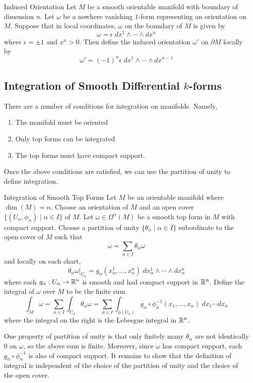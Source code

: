 \documentclass[a4paper]{article}
\begin{document}
\begin{defn}{Induced Orientation}{} Let $M$ be a smooth orientable manifold with boundary of dimension $n$. Let $\omega$ be a nowhere vanishing $1$-form representing an orientation on $M$. Suppose that in local coordinates, $\omega$ on the boundary of $M$ is given by $$\omega=\epsilon\;dx^1\wedge\cdots\wedge dx^n$$ where $\epsilon=\pm1$ and $x^n>0$. Then define the induced orientation $\omega'$ on $\partial M$ locally by $$\omega'=(-1)^n\epsilon\;dx^1\wedge\cdots\wedge dx^{n-1}$$
\end{defn}

\subsection{Integration of Smooth Differential $k$-forms}
There are a number of conditions for integration on manifolds. Namely, 
\begin{enumerate}
\item The manifold must be oriented
\item Only top forms can be integrated
\item The top forms must have compact support. 
\end{enumerate}

Once the above conditions are satisfied, we can use the partition of unity to define integration.  

\begin{defn}{Integration of Smooth Top Forms}{} Let $M$ be an orientable manifold where $\dim(M)=n$. Choose an orientation of $M$ and an open cover $\{(U_\alpha,\phi_\alpha)\;|\;\alpha\in I\}$ of $M$. Let $\omega\in\Omega^n(M)$ be a smooth top form in $M$ with compact support. Choose a partition of unity $\{\theta_\alpha\;|\;\alpha\in I\}$ subordinate to the open cover of $M$ such that $$\omega=\sum_{\alpha\in I}\theta_\alpha\omega$$ and locally on each chart, $$\theta_\alpha\omega|_{U_\alpha}=g_\alpha(x_\alpha^1,\dots,x_\alpha^n)\;dx_\alpha^1\wedge\cdots\wedge dx_\alpha^n$$ where each $g_\alpha:U_\alpha\to\mathbb{R}^n$ is smooth and had compact support in $\mathbb{R}^n$. Define the integral of $\omega$ over $M$ to be the finite sum $$\int_M\omega=\sum_{\alpha\in I}\int_{U_\alpha}\theta_\alpha\omega=\sum_{\alpha\in I}\int_{\phi(U_\alpha)}g_\alpha\circ\phi_\alpha^{-1}(x_1,\dots,x_n)\;dx_1\cdots dx_n$$ where the integral on the right is the Lebesgue integral in $\mathbb{R}^n$. 
\end{defn}

One property of partition of unity is that only finitely many $\theta_\alpha$ are not identically $0$ on $\omega$, so the above sum is finite. Moreover, since $\omega$ has compact support, each $g_\alpha\circ\phi_\alpha^{-1}$ is also of compact support. It remains to show that the definition of integral is independent of the choice of the partition of unity and the choice of the open cover. 
\end{document}
